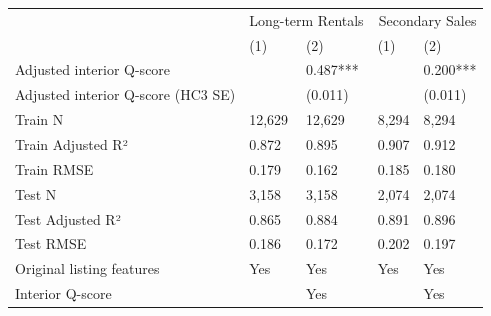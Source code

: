 \begin{tabular}{lllll}
\toprule
 & \multicolumn{2}{r}{Long-term Rentals} & \multicolumn{2}{r}{Secondary Sales} \\
 & (1) & (2) & (1) & (2) \\
\midrule
Adjusted interior Q-score &  & 0.487*** &  & 0.200*** \\
Adjusted interior Q-score (HC3 SE) &  & (0.011) &  & (0.011) \\
Train N & 12,629 & 12,629 & 8,294 & 8,294 \\
Train Adjusted R² & 0.872 & 0.895 & 0.907 & 0.912 \\
Train RMSE & 0.179 & 0.162 & 0.185 & 0.180 \\
Test N & 3,158 & 3,158 & 2,074 & 2,074 \\
Test Adjusted R² & 0.865 & 0.884 & 0.891 & 0.896 \\
Test RMSE & 0.186 & 0.172 & 0.202 & 0.197 \\
Original listing features & Yes & Yes & Yes & Yes \\
Interior Q-score &  & Yes &  & Yes \\
\bottomrule
\end{tabular}
